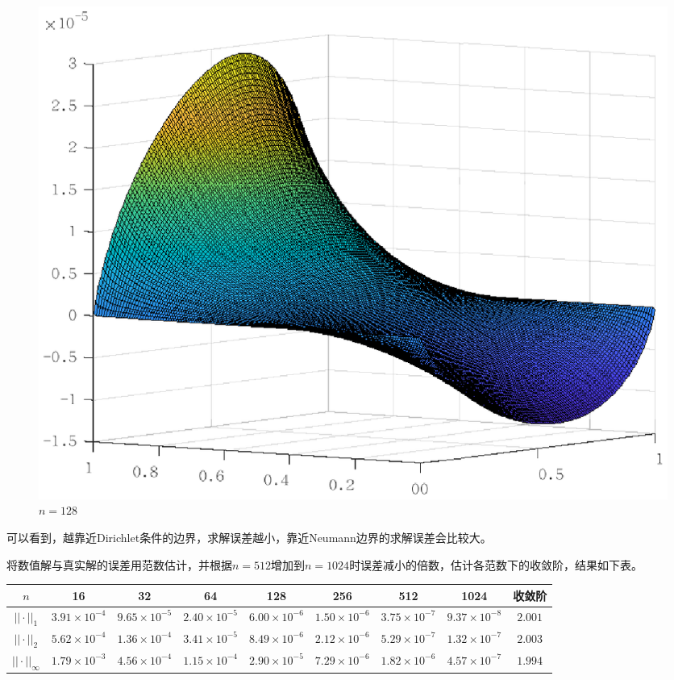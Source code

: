 \documentclass[lang=cn,10pt]{elegantbook}
\begin{document}
\begin{figure}[H]
\begin{minipage}[t]{0.24\linewidth}
    \caption*{$n=64$}
  \end{minipage}
  \begin{minipage}[t]{0.24\linewidth}
    \centering
    \includegraphics[width=0.8\linewidth]{figure/2-3-4.eps}
    \caption*{$n=128$}
  \end{minipage}
\end{figure}

可以看到，越靠近Dirichlet条件的边界，求解误差越小，靠近Neumann边界的求解误差会比较大。

将数值解与真实解的误差用范数估计，并根据$n=512$增加到$n=1024$时误差减小的倍数，估计各范数下的收敛阶，结果如下表。

\begin{table}[H]
  \centering
  \small
  \begin{tabular}{c|ccccccc|c}
  \textbf{$n$}        & 16                   & 32                   & 64                   & 128                  & 256                  & 512                  & 1024                  & 收敛阶 \\ \hline
  $||\cdot||_1$      & $3.91\times 10^{-4}$ & $9.65\times 10^{-5}$ & $2.40\times 10^{-5}$ & $6.00\times 10^{-6}$ & $1.50\times 10^{-6}$ & $3.75\times 10^{-7}$ & $9.37\times 10^{-8}$ & $2.001$\\
  $||\cdot||_2$      & $5.62\times 10^{-4}$ & $1.36\times 10^{-4}$ & $3.41\times 10^{-5}$ & $8.49\times 10^{-6}$ & $2.12\times 10^{-6}$ & $5.29\times 10^{-7}$ & $1.32\times 10^{-7}$ & $2.003$\\
  $||\cdot||_\infty$ & $1.79\times 10^{-3}$ & $4.56\times 10^{-4}$ & $1.15\times 10^{-4}$ & $2.90\times 10^{-5}$ & $7.29\times 10^{-6}$ & $1.82\times 10^{-6}$ & $4.57\times 10^{-7}$ & $1.994$
  \end{tabular}
\end{table}
\end{document}
